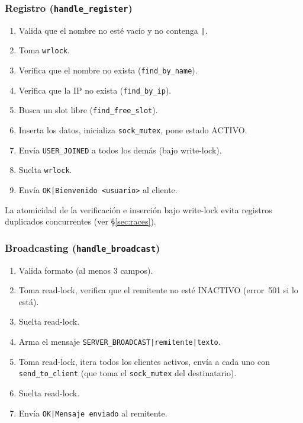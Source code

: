 \documentclass[12pt,a4paper]{article}
\begin{document}
\subsubsection{Registro (\texttt{handle\_register})}

\begin{enumerate}[nosep]
    \item Valida que el nombre no esté vacío y no contenga \texttt{|}.
    \item Toma \texttt{wrlock}.
    \item Verifica que el nombre no exista (\texttt{find\_by\_name}).
    \item Verifica que la IP no exista (\texttt{find\_by\_ip}).
    \item Busca un slot libre (\texttt{find\_free\_slot}).
    \item Inserta los datos, inicializa \texttt{sock\_mutex}, pone estado ACTIVO.
    \item Envía \texttt{USER\_JOINED} a todos los demás (bajo write-lock).
    \item Suelta \texttt{wrlock}.
    \item Envía \texttt{OK|Bienvenido <usuario>} al cliente.
\end{enumerate}

La atomicidad de la verificación e inserción bajo write-lock evita registros
duplicados concurrentes (ver \S\ref{sec:races}).

\subsubsection{Broadcasting (\texttt{handle\_broadcast})}

\begin{enumerate}[nosep]
    \item Valida formato (al menos 3 campos).
    \item Toma read-lock, verifica que el remitente no esté INACTIVO (error~501 si lo está).
    \item Suelta read-lock.
    \item Arma el mensaje \texttt{SERVER\_BROADCAST|remitente|texto}.
    \item Toma read-lock, itera todos los clientes activos, envía a cada uno
          con \texttt{send\_to\_client} (que toma el \texttt{sock\_mutex} del
          destinatario).
    \item Suelta read-lock.
    \item Envía \texttt{OK|Mensaje enviado} al remitente.
\end{enumerate}
\end{document}
